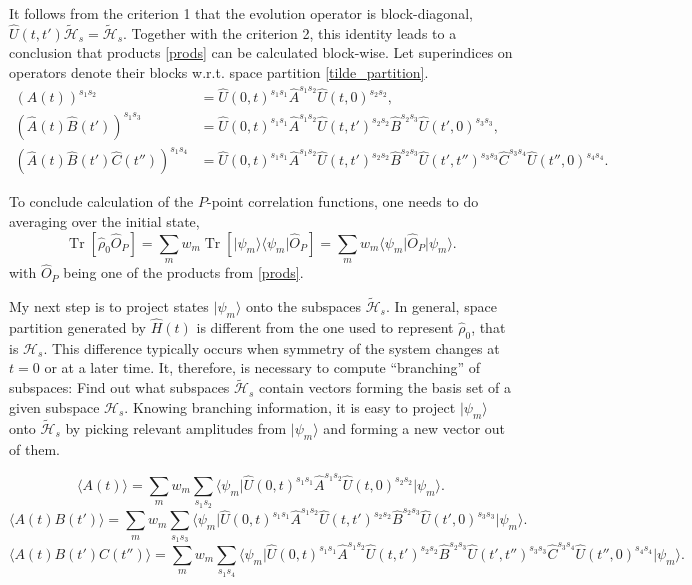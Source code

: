 \documentclass[]{article}
\DeclareMathOperator{\Tr}{Tr}
\newcommand{\bra}[1]{\ensuremath{\langle#1|}}
\newcommand{\ket}[1]{\ensuremath{|#1\rangle}}
\newcommand{\aver}[1]{\ensuremath{\langle#1\rangle}}
\begin{document}
It follows from the criterion 1 that the evolution operator is block-diagonal, $\hat U(t,t')\mathcal{\tilde H}_s = \mathcal{\tilde H}_s$. Together with the criterion 2, this identity leads to a conclusion that products \ref{prods} can be calculated block-wise. Let superindices on operators denote their
blocks w.r.t. space partition \ref{tilde_partition}.
\begin{equation}
\begin{aligned}
    (A(t))^{s_1s_2} &=
    \hat U(0,t)^{s_1s_1}\hat A^{s_1s_2}
    \hat U(t,0)^{s_2s_2},\\
    (\hat A(t) \hat B(t'))^{s_1s_3} &=
    \hat U(0,t)^{s_1s_1}\hat A^{s_1s_2}
    \hat U(t,t')^{s_2s_2}\hat B^{s_2s_3}
    \hat U(t',0)^{s_3s_3},\\
    (\hat A(t) \hat B(t') \hat C(t''))^{s_1s_4} &=
    \hat U(0,t)^{s_1s_1} \hat A^{s_1s_2}
    \hat U(t,t')^{s_2s_2} \hat B^{s_2s_3}
    \hat U(t',t'')^{s_3s_3} \hat C^{s_3s_4}
    \hat U(t'',0)^{s_4s_4}.
\end{aligned}
\end{equation}

To conclude calculation of the $P$-point correlation functions, one needs to do averaging over the initial state,
\begin{equation}
    \Tr[\hat\rho_0 \hat O_P] =
    \sum_{m}w_m\Tr\left[\ket{\psi_m}\bra{\psi_m}\hat O_P\right] =
    \sum_{m}w_m\bra{\psi_m}\hat O_P\ket{\psi_m}.
\end{equation}
with $\hat O_P$ being one of the products from \ref{prods}.

My next step is to project states $\ket{\psi_m}$ onto the subspaces $\mathcal{\tilde H}_s$.
In general, space partition generated by $\hat H(t)$ is different from the one used to represent $\hat\rho_0$, that is $\mathcal{H}_s$. This difference typically occurs when symmetry of the system changes at $t=0$ or at a later time. It, therefore, is necessary to compute ``branching'' of subspaces: Find out what subspaces $\mathcal{\tilde H}_s$ contain vectors forming the basis set of a given subspace $\mathcal{H}_s$.
Knowing branching information, it is easy to project $\ket{\psi_m}$ onto $\mathcal{\tilde H}_s$ by picking relevant amplitudes from $\ket{\psi_m}$ and
forming a new vector out of them.

\begin{equation}\label{1point_wl}
    \aver{A(t)} =
    \sum_m w_m\sum_{s_1s_2}
    \bra{\psi_m}
    \hat U(0,t)^{s_1s_1}\hat A^{s_1s_2}
    \hat U(t,0)^{s_2s_2}
    \ket{\psi_m}.
\end{equation}
\begin{equation}\label{2point_wl}
    \aver{A(t) B(t')} =
    \sum_m w_m\sum_{s_1s_3}
    \bra{\psi_m}
    \hat U(0,t)^{s_1s_1}\hat A^{s_1s_2}
    \hat U(t,t')^{s_2s_2}\hat B^{s_2s_3}
    \hat U(t',0)^{s_3s_3}
    \ket{\psi_m}.
\end{equation}
\begin{equation}\label{3point_wl}
    \aver{A(t) B(t') C(t'')} =
    \sum_m w_m\sum_{s_1s_4}
    \bra{\psi_m}
    \hat U(0,t)^{s_1s_1} \hat A^{s_1s_2}
    \hat U(t,t')^{s_2s_2} \hat B^{s_2s_3}
    \hat U(t',t'')^{s_3s_3} \hat C^{s_3s_4}
    \hat U(t'',0)^{s_4s_4}
    \ket{\psi_m}.
\end{equation}
\end{document}
